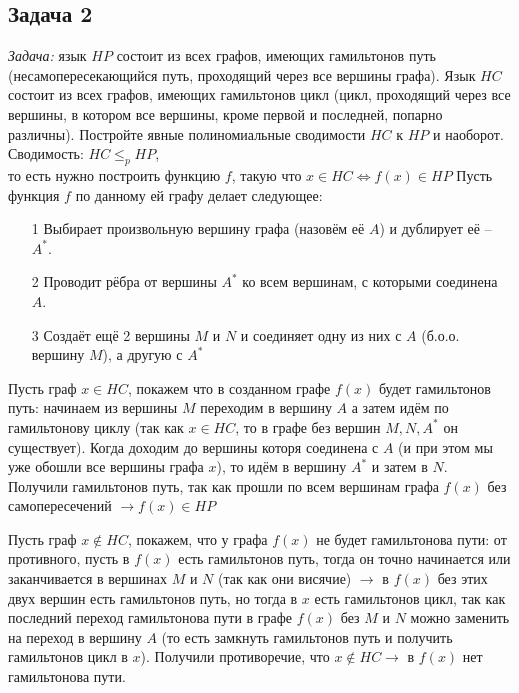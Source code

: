 \documentclass[a4paper,12pt]{article} %
\begin{document}
\subsection*{Задача 2}
\textit{Задача:} язык $HP$ состоит из всех графов, имеющих гамильтонов путь (несамопересекающийся путь, проходящий через все вершины графа). Язык $HC$ состоит из всех графов, имеющих гамильтонов цикл (цикл, проходящий через все вершины, в котором все вершины, кроме первой и последней, попарно различны).
Постройте явные полиномиальные сводимости $HC$ к $HP$ и наоборот.\\

Сводимость: $ HC \leq_p HP $, \\
то есть нужно построить функцию $ f $, такую что $ x \in HC \Longleftrightarrow f(x)\in HP $
Пусть функция $ f $ по данному ей графу делает следующее:
\begin{itemize}
\item[1] Выбирает произвольную вершину графа (назовём её $ A $) и дублирует её -- $ A^* $.
\item[2] Проводит рёбра от вершины $ A^* $ ко всем вершинам, с которыми соединена $ A $.
\item[3] Создаёт ещё 2 вершины $ M $ и $ N $ и соединяет одну из них с $ A $ (б.о.о. вершину $ M $), а другую с $ A^* $
\end{itemize}

Пусть граф $ x \in HC $, покажем что в созданном графе $ f(x) $ будет гамильтонов путь: начинаем из вершины $ M $ переходим в вершину $ A $ а затем идём по гамильтонову циклу (так как $ x \in HC $, то в графе без вершин $ M,N,A^* $ он существует). Когда доходим до вершины которя соединена с $ A $ (и при этом мы уже обошли все вершины графа $ x $), то идём в вершину $ A^* $ и затем в $ N $. Получили гамильтонов путь, так как прошли по всем вершинам графа $ f(x) $ без самопересечений $ \longrightarrow f(x)\in HP$

Пусть граф $ x \notin HC $, покажем, что у графа $ f(x) $ не будет гамильтонова пути: от противного, пусть в $ f(x) $ есть гамильтонов путь, тогда он точно начинается или заканчивается в вершинах $ M $ и $ N $ (так как они висячие) $ \longrightarrow $ в $ f(x) $ без этих двух вершин есть гамильтонов путь, но тогда в $ x $ есть гамильтонов цикл, так как последний переход гамильтонова пути в графе $ f(x) $ без $ M $ и $ N $ можно заменить на переход в вершину $ A $ (то есть замкнуть гамильтонов путь и получить гамильтонов цикл в $ x $). Получили противоречие, что $ x \notin HC \longrightarrow$ в $ f(x) $  нет гамильтонова пути.
\end{document}

